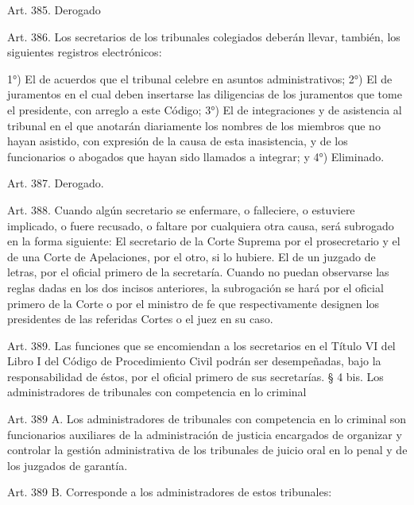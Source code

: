     Art. 385. Derogado


    Art. 386. Los secretarios de los tribunales colegiados deberán llevar, también, los siguientes registros electrónicos:

    1°) El de acuerdos que el tribunal celebre en asuntos administrativos;
    2°) El de juramentos en el cual deben insertarse las diligencias de los juramentos que tome el presidente, con arreglo a este Código;
    3°) El de integraciones y de asistencia al tribunal en el que anotarán diariamente los nombres de los miembros que no hayan asistido, con expresión de la causa de esta inasistencia, y de los funcionarios o abogados que hayan sido llamados a integrar; y
    4°) Eliminado.


    Art. 387. Derogado.




    Art. 388. Cuando algún secretario se enfermare, o falleciere, o estuviere implicado, o fuere recusado, o faltare por cualquiera otra causa, será subrogado en la forma siguiente:
    El secretario de la Corte Suprema por el prosecretario y el de una Corte de Apelaciones, por el otro, si lo hubiere.
    El de un juzgado de letras, por el oficial primero de la secretaría.
    Cuando no puedan observarse las reglas dadas en los dos incisos anteriores, la subrogación se hará por el oficial primero de la Corte o por el ministro de fe que respectivamente designen los presidentes de las referidas Cortes o el juez en su caso.



    Art. 389. Las funciones que se encomiendan a los secretarios en el Título VI del Libro I del Código de Procedimiento Civil podrán ser desempeñadas, bajo la responsabilidad de éstos, por el oficial primero de sus secretarías.
    § 4 bis. Los administradores de tribunales con competencia en lo criminal

    Art. 389 A. Los administradores de tribunales con competencia en lo criminal son funcionarios auxiliares de la administración de justicia encargados de organizar y controlar la gestión administrativa de los tribunales de juicio oral en lo penal y de los juzgados de garantía.

    Art. 389 B. Corresponde a los administradores de estos tribunales:

